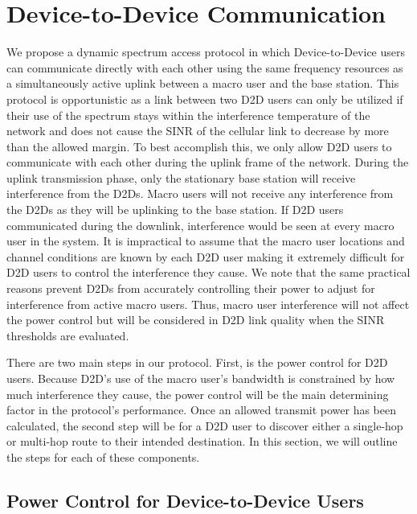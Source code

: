 \documentclass[10pt, final, journal, letterpaper,oneside, twocolumn]{IEEEtran}
\begin{document}
\section{Device-to-Device Communication}
\label{sec:discovery}
We propose a dynamic spectrum access protocol in which Device-to-Device users can communicate directly with each other using the same frequency resources as a simultaneously active uplink between a macro user and the base station.  This protocol is opportunistic as a link between two D2D users can only be utilized if their use of the spectrum  stays within the interference temperature of the network and does not cause the SINR of the cellular link to decrease by more than the allowed margin.  To best accomplish this, we only allow D2D users to communicate with each other during the uplink frame of the network.  During the uplink transmission phase, only the stationary base station will receive interference from the D2Ds.  Macro users will not receive any interference from the D2Ds as they will be uplinking to the base station.  If D2D users communicated during the downlink, interference would be seen at every macro user in the system.  It is impractical to assume that the macro user locations and channel conditions are known by each D2D user making it extremely difficult for D2D users to control the interference they cause.  We note that the same practical reasons prevent D2Ds from accurately controlling their power to adjust for interference from active macro users.  Thus, macro user interference will not affect the power control but will be considered in D2D link quality when the SINR thresholds are evaluated.  

There are two main steps in our protocol.  First, is the power control for D2D users.  Because D2D's use of the macro user's bandwidth is constrained by how much interference they cause, the power control will be the main determining factor in the protocol's performance.  Once an allowed transmit power has been calculated, the second step will be for a D2D user to discover either a single-hop or multi-hop route to their intended destination.  In this section, we will outline the steps for each of these components.  

\subsection{Power Control for Device-to-Device Users}
\label{sec:power_control}
\end{document}
